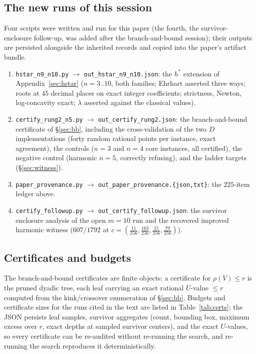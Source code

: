 \subsection{The new runs of this session}

Four scripts were written and run for this paper (the fourth, the
survivor-enclosure follow-up, was added after the branch-and-bound
session); their outputs are persisted alongside the inherited records
and copied into the paper's artifact bundle.

\begin{enumerate}[leftmargin=1.6em,itemsep=2pt]
\item \texttt{hstar\_n9\_n10.py} $\to$ \texttt{out\_hstar\_n9\_n10.json}:
the $h^*$ extension of Appendix~\ref{sec:hstar} ($n=3..10$, both
families; Ehrhart asserted three ways; roots at $45$ decimal places on
exact integer coefficients; strictness, Newton, log-concavity exact;
$\lambda$ asserted against the classical values).
\item \texttt{certify\_rung2\_n5.py} $\to$
\texttt{out\_certify\_rung2.json}: the branch-and-bound certificate of
\S\ref{sec:bb}, including the cross-validation of the two $D$
implementations (forty random rational points per instance, exact
agreement), the controls ($n=3$ and $n=4$ core instances, all
certified), the negative control (harmonic $n=5$, correctly refusing),
and the ladder targets (\S\ref{sec:witness}).
\item \texttt{paper\_provenance.py} $\to$
\texttt{out\_paper\_provenance.\{json,txt\}}: the $225$-item ledger
above.
\item \texttt{certify\_followup.py} $\to$
\texttt{out\_certify\_followup.json}: the survivor enclosure analysis
of the open $m=10$ run and the recovered improved harmonic witness
($607/1792$ at $c=(\tfrac{11}{256},\tfrac{163}{256},
\tfrac{15}{256},\tfrac{79}{256})$).
\end{enumerate}

\subsection{Certificates and budgets}

The branch-and-bound certificates are finite objects: a certificate for
$\rho(V)\le r$ is the pruned dyadic tree, each leaf carrying an exact
rational $U$-value $\le r$ computed from the kink/crossover enumeration
of \S\ref{sec:bb}. Budgets and certificate sizes for the runs cited in
the text are listed in Table~\ref{tab:certs}; the JSON persists leaf
samples, survivor aggregates (count, bounding box, maximum excess over
$r$, exact depths at sampled survivor centers), and the exact
$U$-values, so every certificate can be re-audited without re-running
the search, and re-running the search reproduces it deterministically.


